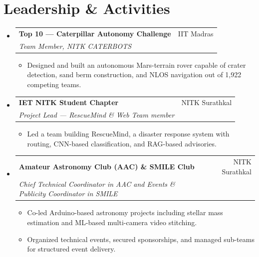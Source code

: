 \documentclass[letterpaper,11pt]{article}
\makeatletter
\newcommand{\resumeItem}[1]{
  \item\small{
    {#1 \vspace{-2pt}}
  }
}
\newcommand{\resumeSubheading}[4]{
  \vspace{-2pt}\item
    \begin{tabular*}{0.97\textwidth}[t]{l@{\extracolsep{\fill}}r}
      \textbf{#1} & \small #2 \\
      \textit{\small#3} & \textit{\small #4} \\
    \end{tabular*}\vspace{-7pt}
}
\newcommand{\resumeSubHeadingListStart}{\begin{itemize}[leftmargin=0.15in, label={}]}
\newcommand{\resumeSubHeadingListEnd}{\end{itemize}}
\newcommand{\resumeItemListStart}{\begin{itemize}}
\newcommand{\resumeItemListEnd}{\end{itemize}\vspace{-5pt}}
\makeatother
\begin{document}
\section{Leadership \& Activities}

  \resumeSubHeadingListStart

    \resumeSubheading
      {Top 10 --- Caterpillar Autonomy Challenge}{IIT Madras}
      {Team Member, NITK CATERBOTS}{}
      \resumeItemListStart
        \resumeItem{Designed and built an autonomous Mars-terrain rover capable of crater detection, sand berm construction, and NLOS navigation out of 1,922 competing teams.}
      \resumeItemListEnd

    \resumeSubheading
      {IET NITK Student Chapter}{NITK Surathkal}
      {Project Lead --- RescueMind \& Web Team member}{}
      \resumeItemListStart
        \resumeItem{Led a team building RescueMind, a disaster response system with routing, CNN-based classification, and RAG-based advisories.}
      \resumeItemListEnd

    \resumeSubheading
      {Amateur Astronomy Club (AAC) \& SMILE Club}{NITK Surathkal}
      {Chief Technical Coordinator in AAC and Events \& Publicity Coordinator in SMILE}{}
      \resumeItemListStart
        \resumeItem{Co-led Arduino-based astronomy projects including stellar mass estimation and ML-based multi-camera video stitching.}
        \resumeItem{Organized technical events, secured sponsorships, and managed sub-teams for structured event delivery.}
      \resumeItemListEnd

  \resumeSubHeadingListEnd

\end{document}
